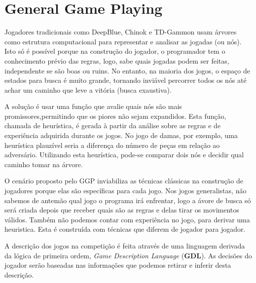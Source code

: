 \section{General Game Playing}
Jogadores tradicionais como DeepBlue\cite{dblue}, Chinok\cite{chinok} e
TD-Gammon\cite{tesauro} usam árvores como estrutura computacional para
representar e analisar as jogadas (ou nós). Isto só é possível porque na
construção do jogador, o programador tem o conhecimento prévio das regras, logo,
sabe quais jogadas podem ser feitas, independente se são boas ou ruins. No
entanto, na maioria dos jogos, o espaço de estados para busca é muito grande,
tornando inviável percorrer todos os nós até achar um caminho que leve a vitória
(busca exaustiva). 

A solução é usar uma função que avalie quais nós são mais promissores,permitindo
que os piores não sejam expandidos. Esta função, chamada de heurística, é gerada
à partir da análise sobre as regras e de experiência adquirida durante os
jogos. No jogo de damas, por exemplo, uma heurística plauzível seria a diferença
do número de peças em relação ao adversário. Utilizando esta heurística, pode-se
comparar dois nós e decidir qual caminho tomar na árvore.

O cenário proposto pelo GGP inviabiliza as técnicas clássicas na construção de
jogadores porque elas são específicas para cada jogo. Nos jogos generalistas,
não sabemos de antemão qual jogo o programa irá enfrentar, logo a ávore de busca
só será criada depois que receber quais são as regras e delas tirar os movimentos
válidos. Também não podemos contar com experiência no jogo, para derivar uma
heuristica. Esta é construída com técnicas que diferem de jogador para jogador. 

A descrição dos jogos na competição é feita através de uma linguagem derivada da
lógica de primeira ordem, {\it Game Description Language} ({\bf GDL}). As
decisões do jogador serão baseadas nas informações que podemos retirar e inferir
desta descrição.  
